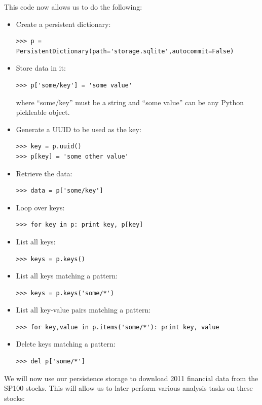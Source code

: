\documentclass[justified,sixbynine]{tufte-book}
\theoremstyle{plain}%
\theoremstyle{definition}
\theoremstyle{remark}
\begin{document}
\begin{fullwidth}
This code now allows us to do the following:
\begin{itemize}
\item Create a persistent dictionary:
\begin{lstlisting}
>>> p = PersistentDictionary(path='storage.sqlite',autocommit=False)
\end{lstlisting}
\item Store data in it:
\begin{lstlisting}
>>> p['some/key'] = 'some value'
\end{lstlisting}
where ``some/key'' must be a string and ``some value'' can be any Python pickleable object.
\item Generate a UUID to be used as the key:
\begin{lstlisting}
>>> key = p.uuid()
>>> p[key] = 'some other value'
\end{lstlisting}
\item Retrieve the data:
\begin{lstlisting}
>>> data = p['some/key']
\end{lstlisting}
\item Loop over keys:
\begin{lstlisting}
>>> for key in p: print key, p[key]
\end{lstlisting}
\item List all keys:
\begin{lstlisting}
>>> keys = p.keys()
\end{lstlisting}
\item List all keys matching a pattern:
\begin{lstlisting}
>>> keys = p.keys('some/*')
\end{lstlisting}
\item List all key-value pairs matching a pattern:
\begin{lstlisting}
>>> for key,value in p.items('some/*'): print key, value
\end{lstlisting}
\item Delete keys matching a pattern:
\begin{lstlisting}
>>> del p['some/*']
\end{lstlisting}
\end{itemize}

We will now use our persistence storage to download 2011 financial data from the SP100 stocks. This will allow us to later perform various analysis tasks on these stocks:


\end{fullwidth}
\end{document}

